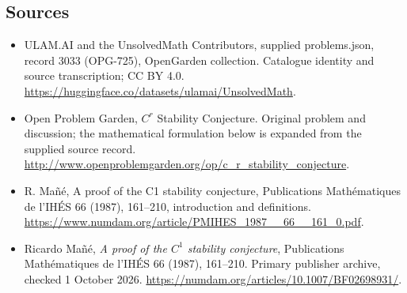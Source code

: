 \documentclass[11pt,a4paper]{article}
\begin{document}
\subsection{Sources}
\begin{itemize}
\item[S1] ULAM.AI and the UnsolvedMath Contributors, supplied problems.json, record 3033 (OPG-725), OpenGarden collection. Catalogue identity and source transcription; CC BY 4.0.
\url{https://huggingface.co/datasets/ulamai/UnsolvedMath}.
\item[S2] Open Problem Garden, $C^r$ Stability Conjecture. Original problem and discussion; the mathematical formulation below is expanded from the supplied source record.
\url{http://www.openproblemgarden.org/op/c_r_stability_conjecture}.
\item[S3] R. Mañé, A proof of the C1 stability conjecture, Publications Mathématiques de l’IHÉS 66 (1987), 161–210, introduction and definitions.
\url{https://www.numdam.org/article/PMIHES_1987__66__161_0.pdf}.

\item[R1] Ricardo Ma\~n\'e, \emph{A proof of the $C^1$ stability
conjecture}, Publications Math\'ematiques de l'IH\'ES 66 (1987),
161--210. Primary publisher archive, checked 1 October 2026.
\url{https://numdam.org/articles/10.1007/BF02698931/}.

\end{itemize}
\end{document}
